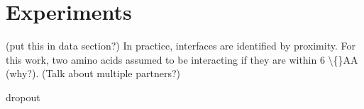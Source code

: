 \chapter{Experiments}
\label{chap:experiments}


(put this in data section?)
In practice, interfaces are identified by proximity. For this work, two amino acids assumed to be interacting if they are within 6 \textbackslash\{\}AA (why?). (Talk about multiple partners?)

dropout